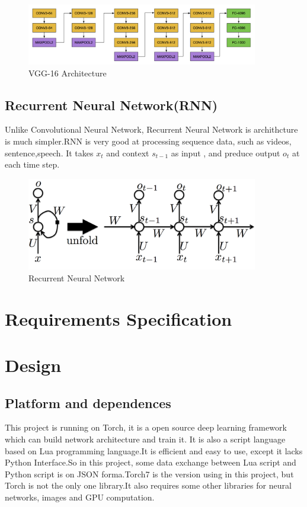 \documentclass[12pt,a4paper]{report}
\begin{document}
\begin{itemize}
\begin{figure}[h]
\centering
\includegraphics[width=0.9\textwidth]{vgg16.png}
\caption{VGG-16 Architecture}
\end{figure}

\end{itemize}
\subsection{Recurrent Neural Network(RNN)}
Unlike Convolutional Neural Network, Recurrent Neural Network is archithcture is much simpler.RNN is very good at processing sequence data, such as videos, sentence,speech. It takes  $x_t$ and context $s_{t-1}$  as input , and preduce output  $o_t$ at each time step.

\begin{figure}[h]
\centering
\includegraphics[width=0.9\textwidth]{rnn1.png}
\caption{Recurrent Neural Network}
\end{figure}


\newpage
\section{Requirements Specification}

\section{Design}

\subsection{Platform and dependences}
This project is running on Torch, it is a open source deep learning framework which can build network architecture and train it. It is also a script language based on Lua programming language.It is efficient and easy to use, except it lacks Python Interface.So in this project, some data exchange between Lua script and Python script is on JSON forma.Torch7 is the version using in this project, but Torch is not the only one library.It also requires some other libraries for neural networks, images and GPU computation.
\end{document}
